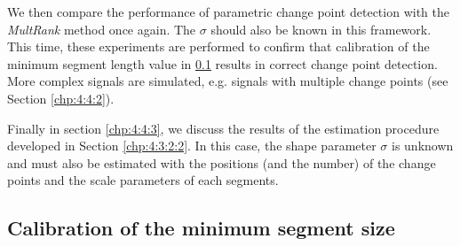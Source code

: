 We then compare the performance of parametric change point detection with the \textit{MultRank} method once again. The $\sigma$ should also be known in this framework. This time, these experiments are performed to confirm that calibration of the minimum segment length value in \ref{chp:4:4:1} results in correct change point detection. More complex signals are simulated, e.g. signals with multiple change points (see Section \ref{chp:4:4:2}).  

Finally in section \ref{chp:4:4:3}, we discuss the results of the estimation procedure developed in Section \ref{chp:4:3:2:2}. In this case, the shape parameter $\sigma$ is unknown and must also be estimated with the positions (and the number) of the change points and the scale parameters of each segments. 

\subsection{Calibration of the minimum segment size}\label{chp:4:4:1}


 


